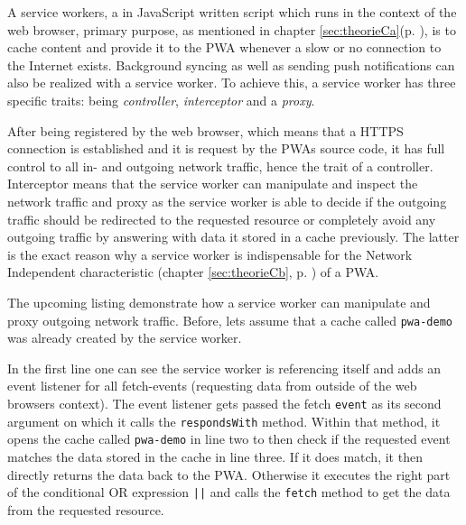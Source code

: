 A service workers, a in JavaScript written script which runs in the context of the web browser, primary purpose, as mentioned in chapter \ref{sec:theorieCa}(p. \pageref{sec:theorieCa}), is to cache content and provide it to the PWA whenever a slow or no connection to the Internet exists. Background syncing as well as sending push notifications can also be realized with a service worker. To achieve this, a service worker has three specific traits: being \textit{controller}, \textit{interceptor} and a \textit{proxy}. 

After being registered by the web browser, which means that a HTTPS connection is established and it is request by the PWAs source code, it has full control to all in- and outgoing network traffic, hence the trait of a controller. Interceptor means that the service worker can manipulate and inspect the network traffic and proxy as the service worker is able to decide if the outgoing traffic should be redirected to the requested resource or completely avoid any outgoing traffic by answering with data it stored in a cache previously. The latter is the exact reason why a service worker is indispensable for the Network Independent characteristic (chapter \ref{sec:theorieCb}, p. \pageref{sec:theorieCb}) of a PWA.

The upcoming listing demonstrate how a service worker can manipulate and proxy outgoing network traffic. Before, lets assume that a cache called \texttt{pwa-demo} was already created by the service worker.

\begin{center}
	\begin{minipage}{\textwidth}
		
	\end{minipage}
\end{center}

In the first line one can see the service worker is referencing itself and adds an event listener for all fetch-events (requesting data from outside of the web browsers context). The event listener gets passed the fetch \texttt{event} as its second argument on which it calls the \texttt{respondsWith} method. Within that method, it opens the cache called \texttt{pwa-demo} in line two to then check if the requested event matches the data stored in the cache in line three. If it does match, it then directly returns the data back to the PWA. Otherwise it executes the right part of the conditional OR expression \texttt{||} and calls the \texttt{fetch} method to get the data from the requested resource. \cite[p. 60]{liebelProgressiveWebApps2019}

